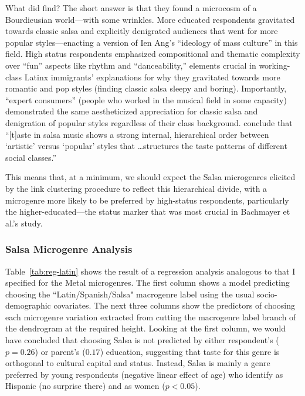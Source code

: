 \documentclass[a4paper,12pt]{extarticle}
\begin{document}
What did \citet{Bachmayer2014-pk} find? The short answer is that they found a microcosm of a Bourdieusian world---with some wrinkles. More educated respondents gravitated towards classic salsa and explicitly denigrated audiences that went for more popular styles---enacting a version of Ien Ang's \citeyearpar{ang2000dallas} ``ideology of mass culture'' in this field. High status respondents emphasized compositional and thematic complexity over ``fun'' aspects like rhythm and ``danceability,'' elements crucial in working-class Latinx immigrants' explanations for why they gravitated towards more romantic and pop styles (finding classic salsa sleepy and boring). Importantly, ``expert consumers'' (people who worked in the musical field in some capacity) demonstrated the same aestheticized appreciation for classic salsa and denigration of popular styles regardless of their class background. \citep[][62]{Bachmayer2014-pk} conclude that ``[t]aste in salsa music shows a strong internal, hierarchical order between `artistic' versus `popular' styles that \ldots structures the taste patterns of different social classes.'' 

This means that, at a minimum, we should expect the Salsa microgenres elicited by the link clustering procedure to reflect this hierarchical divide, with a microgenre more likely to be preferred by high-status respondents, particularly the higher-educated---the status marker that was most crucial in Bachmayer et al.'s study. 

\subsubsection{Salsa Microgenre Analysis}
Table~\ref{tab:reg-latin} shows the result of a regression analysis analogous to that I specified for the Metal microgenres. The first column shows a model predicting choosing the ``Latin/Spanish/Salsa" macrogenre label using the usual socio-demographic covariates. The next three columns show the predictors of choosing each microgenre variation extracted from cutting the macrogenre label branch of the dendrogram at the required height. Looking at the first column, we would have concluded that choosing Salsa is not predicted by either respondent's ($p = 0.26$) or parent's ($0.17$) education, suggesting that taste for this genre is orthogonal to cultural capital and status. Instead, Salsa is mainly a genre preferred by young respondents (negative linear effect of age) who identify as Hispanic (no surprise there) and as women ($p < 0.05$). 
\end{document}
